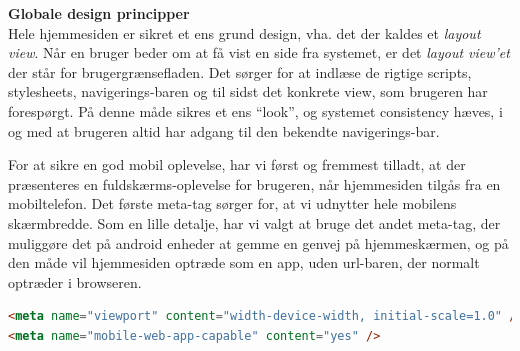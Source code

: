 \textbf{Globale design principper}\hfill\\
Hele hjemmesiden er sikret et ens grund design, vha. det der kaldes et \textit{layout view}.
Når en bruger beder om at få vist en side fra systemet, er det \textit{layout view'et} der står for brugergrænsefladen.
Det sørger for at indlæse de rigtige scripts, stylesheets, navigerings-baren og til sidst det konkrete view, som brugeren har forespørgt.
På denne måde sikres et ens ``look'', og systemet consistency hæves, i og med at brugeren altid har adgang til den bekendte navigerings-bar.

For at sikre en god mobil oplevelse, har vi først og fremmest tilladt, at der præsenteres en fuldskærms-oplevelse for brugeren, når hjemmesiden tilgås fra en mobiltelefon.
Det første meta-tag sørger for, at vi udnytter hele mobilens skærmbredde.
Som en lille detalje, har vi valgt at bruge det andet meta-tag, der muliggøre det på android enheder at gemme en genvej på hjemmeskærmen, og på den måde vil hjemmesiden optræde som en app, uden url-baren, der normalt optræder i browseren.
\begin{lstlisting}[language=HTML]
<meta name="viewport" content="width-device-width, initial-scale=1.0" />
<meta name="mobile-web-app-capable" content="yes" />
\end{lstlisting}


